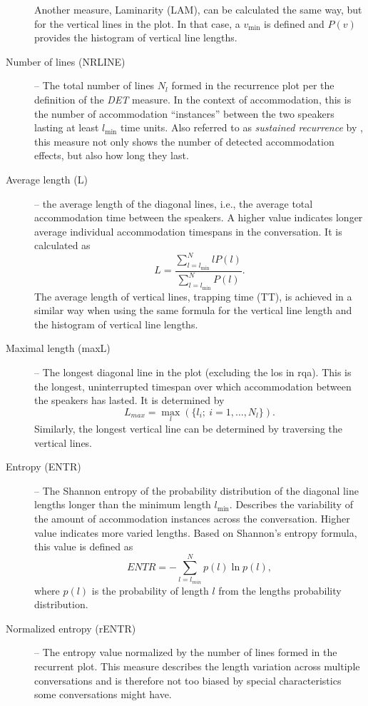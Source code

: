 \begin{description}
	Another measure, Laminarity (LAM), can be calculated the same way, but for the vertical lines in the plot.
	In that case, a $v_{\min}$ is defined and $P(v)$ provides the histogram of vertical line lengths.
	
	\item[Number of lines (NRLINE)] -- The total number of lines $N_l$ formed in the recurrence plot per the definition of the \emph{DET} measure.
	In the context of accommodation, this is the number of accommodation \enquote{instances} between the two speakers lasting at least $l_{\min}$ time units.
	Also referred to as \emph{sustained recurrence} by \citet{Borrie2019syncing}, this measure not only shows the number of detected accommodation effects, but also how long they last.
	
	\item[Average length (L)] -- the average length of the diagonal lines, i.e., the average total accommodation time between the speakers.
	A higher value indicates longer average individual accommodation timespans in the conversation.
	It is calculated as
	\begin{equation}
		\label{eq:l}
		L = \frac{\sum_{l=l_{\min}}^N l P(l)}{\sum_{l=l_{\min}}^N P(l)}.
	\end{equation}
	The average length of vertical lines, trapping time (TT), is achieved in a similar way when using the same formula for the vertical line length and the histogram of vertical line lengths.
	
	\item[Maximal length (maxL)] -- The longest diagonal line in the plot (excluding the \ac{los} in \ac{rqa}).	
	This is the longest, uninterrupted timespan over which accommodation between the speakers has lasted.
	It is determined by
	\begin{equation}
		\label{eq:maxl}
		L_{max} = \max_{l} (\{l_i; \ i=1, \ldots, N_l\}).
	\end{equation}
	Similarly, the longest vertical line can be determined by traversing the vertical lines.
	
	\item[Entropy (ENTR)] -- The Shannon entropy of the probability distribution of the diagonal line lengths longer than the minimum length $l_{\min}$.
	Describes the variability of the amount of accommodation instances across the conversation.
	Higher value indicates more varied lengths.
	Based on Shannon's entropy formula, this value is defined as
	\begin{equation}
		\label{eq:entr}
		ENTR = -\sum_{l=l_{min}}^{N} p(l) \ln p(l),
	\end{equation}
	where $p(l)$ is the probability of length $l$ from the lengths probability distribution.
	\item[Normalized entropy (rENTR)] -- The entropy value normalized by the number of lines formed in the recurrent plot.
	This measure describes the length variation across multiple conversations and is therefore not too biased by special characteristics some conversations might have.
\end{description}
%

